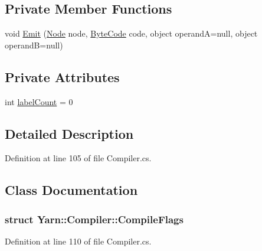 \subsection*{Private Member Functions}
\begin{DoxyCompactItemize}
\item 
void \hyperlink{a00053_a774e8c143cdda0584fcfdda98626a83c}{Emit} (\hyperlink{a00050_a00354}{Node} node, \hyperlink{a00050_ad5dfb6ee68ca7469623ad3e459f98894}{Byte\-Code} code, object operand\-A=null, object operand\-B=null)
\end{DoxyCompactItemize}
\subsection*{Private Attributes}
\begin{DoxyCompactItemize}
\item 
int \hyperlink{a00053_a87758397eba2e84cda8e0d6c40656f3f}{label\-Count} = 0
\end{DoxyCompactItemize}


\subsection{Detailed Description}


Definition at line 105 of file Compiler.\-cs.



\subsection{Class Documentation}
\label{a00350}
\hypertarget{a00053_a00350}{}
\subsubsection{struct Yarn\-:\-:Compiler\-:\-:Compile\-Flags}


Definition at line 110 of file Compiler.\-cs.



